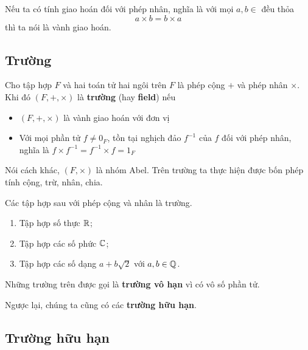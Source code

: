 \begin{definition}
    Nếu ta có tính giao hoán đối với phép nhân, nghĩa là với mọi $a, b \in $ đều thỏa
    \begin{equation*}
        a \times b = b \times a
    \end{equation*}
    thì ta nói là vành giao hoán.
\end{definition}

\subsection*{Trường}

\begin{definition}
    Cho tập hợp $F$ và hai toán tử hai ngôi trên $F$ là phép cộng $+$ và phép nhân $\times$. Khi đó $(F, +, \times)$ là \textbf{trường} (hay \textbf{field}) nếu
    \begin{itemize}
        \item $(F, +, \times)$ là vành giao hoán với đơn vị
        \item Với mọi phần tử $f \neq 0_F$, tồn tại nghịch đảo $f^{-1}$ của $f$ đối với phép nhân, nghĩa là $f \times f^{-1} = f^{-1} \times f = 1_F$
    \end{itemize}
\end{definition}

Nói cách khác, $(F, \times)$ là nhóm Abel. Trên trường ta thực hiện được bốn phép tính cộng, trừ, nhân, chia.

\begin{example}
    Các tập hợp sau với phép cộng và nhân là trường.
    \begin{enumerate}
        \item Tập hợp số thực $\mathbb{R}$;
        \item Tập hợp các số phức $\mathbb{C}$;
        \item Tập hợp các số dạng $a + b \sqrt{2}$ với $a, b \in \mathbb{Q}$.
    \end{enumerate}
\end{example}

Những trường trên được gọi là \textbf{trường vô hạn} vì có vô số phần tử.

Ngược lại, chúng ta cũng có các \textbf{trường hữu hạn}.

\subsection*{Trường hữu hạn}

